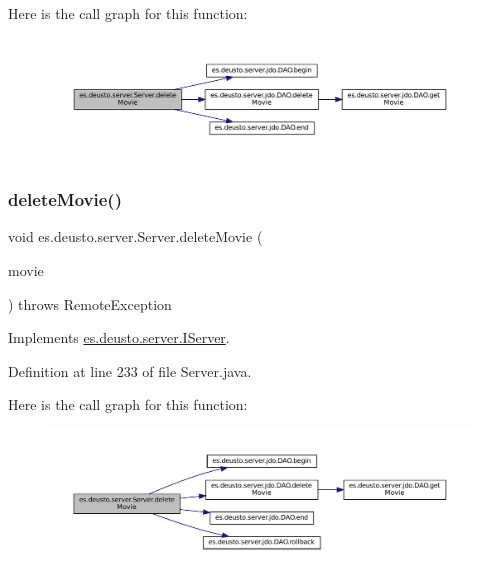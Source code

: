 Here is the call graph for this function\+:
\nopagebreak
\begin{figure}[H]
\begin{center}
\leavevmode
\includegraphics[width=350pt]{classes_1_1deusto_1_1server_1_1_server_a6501e4103fcc2ef691c15e4e02f7136c_cgraph}
\end{center}
\end{figure}
\mbox{\label{classes_1_1deusto_1_1server_1_1_server_a9821a6a51f378535746f26fde396ade5}} 
\subsubsection{\texorpdfstring{deleteMovie()}{deleteMovie()}\hspace{0.1cm}{\footnotesize\ttfamily [2/2]}}
{\footnotesize\ttfamily void es.\+deusto.\+server.\+Server.\+delete\+Movie (\begin{DoxyParamCaption}\item[{\mbox{\hyperlink{classes_1_1deusto_1_1server_1_1data_1_1_movie_d_t_o}{Movie\+D\+TO}}}]{movie }\end{DoxyParamCaption}) throws Remote\+Exception}



Implements \mbox{\hyperlink{interfacees_1_1deusto_1_1server_1_1_i_server_a98cc625828e17ef8b55aefcd9a3f604e}{es.\+deusto.\+server.\+I\+Server}}.



Definition at line 233 of file Server.\+java.

Here is the call graph for this function\+:
\nopagebreak
\begin{figure}[H]
\begin{center}
\leavevmode
\includegraphics[width=350pt]{classes_1_1deusto_1_1server_1_1_server_a9821a6a51f378535746f26fde396ade5_cgraph}
\end{center}
\end{figure}
\mbox{\label{classes_1_1deusto_1_1server_1_1_server_aad2637c9cecc8a8b6f89e630b3711bff}} 
